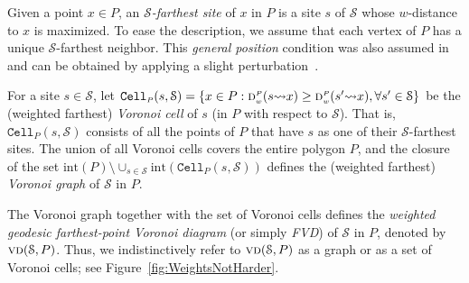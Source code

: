 \documentclass[a4paper,UKenglish]{socg-lipics-v2018}
\newcommand{\s}{\mathcal S}
\newcommand{\dd}[3][P]{\ensuremath{\textsc{d}_{\scriptscriptstyle w}^{\scriptscriptstyle #1}(#2 {\leadsto} #3)}}
\newcommand{\cell}[2][P]{\ensuremath{\mathtt{Cell}_{\scriptscriptstyle #1}(#2)}}
\newcommand{\interior}[1]{\mathrm{int}(#1)}
\newcommand{\vd}[2][P]{\textsc{vd}(#2, #1)}
\begin{document}
Given a point $x\in P$, an \emph{$\s$-farthest site} of $x$ in $P$ is a site  $s$ of  $\s$ whose $w$-distance to $x$ is maximized.
To ease the description, we assume that each vertex of $P$ has a unique $\s$-farthest neighbor. 
This \emph{general position} condition was also assumed in~\cite{ahn2015linear,aronov1993furthest,oh2016farthest} and can be obtained by applying a slight perturbation~\cite{edelsbrunner1990simulation}.

For a site $s\in \s$, let $\cell{s,\s} = \{x\in P: \dd{s}{x} \geq \dd{s'}{x}, \forall s'\in \s\}$ be the (weighted farthest) \emph{Voronoi cell} of $s$ (in $P$ with respect to $\s$). 
That is, $\cell{s,\s}$ consists of all the points of $P$ that have $s$ as one of their $\s$-farthest sites.
The union of all Voronoi cells covers the entire polygon $P$, and the closure of the set $\interior{P} \setminus \cup_{s \in \s} \interior{\cell{s,\s}}$ defines the (weighted farthest) \emph{Voronoi graph} of $\s$ in $P$. 

The Voronoi graph together with the set of Voronoi cells defines the \emph{weighted geodesic farthest-point
Voronoi diagram} (or simply \emph{FVD}) of $\s$ in $P$, denoted by $\vd{\s}$.
Thus, we indistinctively refer to $\vd{\s}$ as a graph or as a set of Voronoi cells; see Figure~\ref{fig:WeightsNotHarder}.
\end{document}
